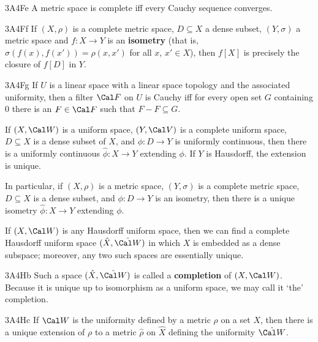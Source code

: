 \spheader 3A4Fe A metric space is complete iff every Cauchy sequence
converges.

\spheader 3A4Ff If $(X,\rho)$ is a complete metric space, $D\subseteq X$
a dense subset, $(Y,\sigma)$ a metric space and $f:X\to Y$ is an
{\bf isometry} (that is, $\sigma(f(x),f(x'))=\rho(x,x')$ for all $x$,
$x'\in X$), then $f[X]$ is precisely the closure of $f[D]$ in $Y$.

\spheader 3A4Fg If $U$ is a linear space with a linear space topology
and the associated uniformity, then a filter $\Cal F$
on $U$ is Cauchy iff for every open set $G$ containing $0$ there is an
$F\in\Cal F$ such that $F-F\subseteq G$.

 If
$(X,\Cal W)$ is a uniform space, $(Y,\Cal V)$ is a complete uniform
space, $D\subseteq X$ is a dense subset of $X$, and $\phi:D\to Y$ is
uniformly continuous,
then there is a uniformly continuous $\hat\phi:X\to Y$ extending $\phi$.
If $Y$ is Hausdorff, the extension is unique.
\cmmnt{$*$} 

In particular, if $(X,\rho)$ is a metric space, $(Y,\sigma)$ is a
complete metric space, $D\subseteq X$ is a dense subset, and
$\phi:D\to Y$ is an isometry, then there is a unique isometry
$\hat\phi:X\to Y$ extending $\phi$.

 If $(X,\Cal W)$ is any Hausdorff
uniform space, then we can find a complete Hausdorff uniform space
$(\hat X,\hat{\Cal W})$ in which $X$ is embedded as a dense
subspace;   moreover, any two such spaces are essentially unique.
\cmmnt{$*$} 

\spheader 3A4Hb Such a space $(\hat X,\hat{\Cal W})$ is called a
{\bf completion} of $(X,\Cal W)$.   Because it is unique up to
isomorphism as a uniform space, we may call it `the' completion.

\spheader 3A4Hc If $\Cal W$ is the
uniformity defined by a metric $\rho$ on a set $X$, then there is a
unique extension of $\rho$ to a metric $\hat\rho$ on $\hat X$ defining
the uniformity $\hat{\Cal W}$.


